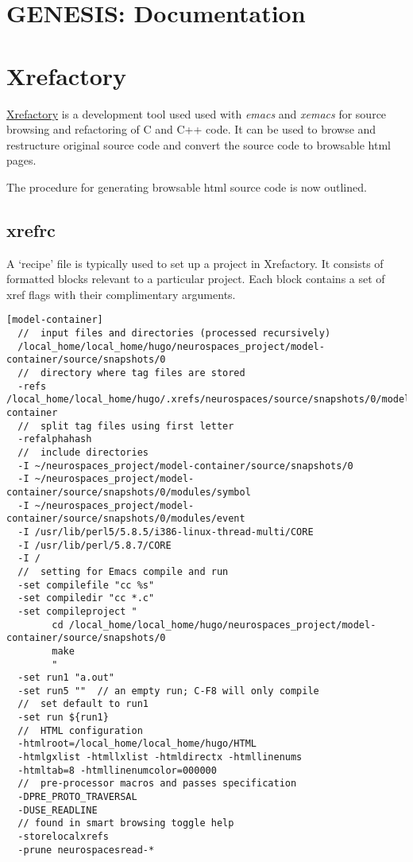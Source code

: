 \documentclass[12pt]{article}
\begin{document}
\section*{GENESIS: Documentation}

\section*{Xrefactory}

\href{http://www.xref.sk/xrefactory/main.html}{Xrefactory} is a development tool used used with {\it emacs} and {\it xemacs} for source browsing and refactoring of C and C++ code. It can be used to browse and restructure original source code and convert the source code to browsable html pages.

The procedure for generating browsable html source code is now outlined.

\subsection*{xrefrc}

A `recipe' file is typically used to set up a project in Xrefactory. It consists of formatted blocks relevant to a particular project. Each block contains a set of xref flags with their complimentary arguments. 

\begin{verbatim}
[model-container]
  //  input files and directories (processed recursively)
  /local_home/local_home/hugo/neurospaces_project/model-container/source/snapshots/0
  //  directory where tag files are stored
  -refs /local_home/local_home/hugo/.xrefs/neurospaces/source/snapshots/0/model-container
  //  split tag files using first letter
  -refalphahash
  //  include directories
  -I ~/neurospaces_project/model-container/source/snapshots/0
  -I ~/neurospaces_project/model-container/source/snapshots/0/modules/symbol
  -I ~/neurospaces_project/model-container/source/snapshots/0/modules/event
  -I /usr/lib/perl5/5.8.5/i386-linux-thread-multi/CORE
  -I /usr/lib/perl/5.8.7/CORE
  -I /
  //  setting for Emacs compile and run
  -set compilefile "cc %s"
  -set compiledir "cc *.c"
  -set compileproject "
        cd /local_home/local_home/hugo/neurospaces_project/model-container/source/snapshots/0
        make
        "
  -set run1 "a.out"
  -set run5 ""  // an empty run; C-F8 will only compile
  //  set default to run1
  -set run ${run1}
  //  HTML configuration
  -htmlroot=/local_home/local_home/hugo/HTML
  -htmlgxlist -htmllxlist -htmldirectx -htmllinenums
  -htmltab=8 -htmllinenumcolor=000000
  //  pre-processor macros and passes specification
  -DPRE_PROTO_TRAVERSAL
  -DUSE_READLINE
  // found in smart browsing toggle help
  -storelocalxrefs
  -prune neurospacesread-*
\end{verbatim}  
  
\end{document}
